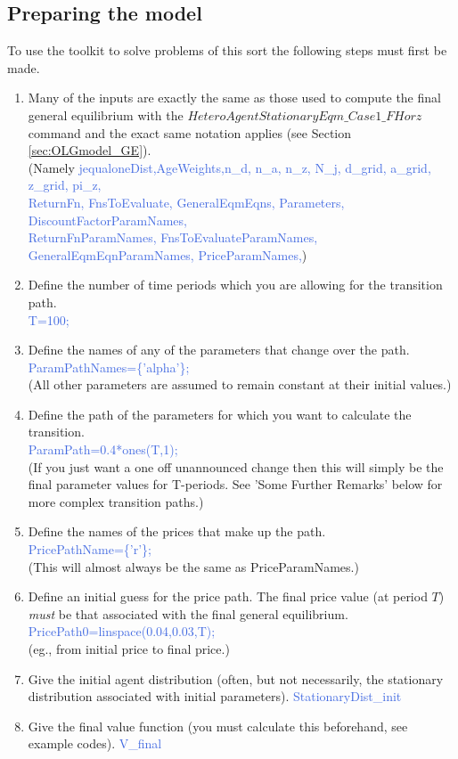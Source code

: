 \subsection{Preparing the model}
To use the toolkit to solve problems of this sort the following steps must first be made.
\begin{enumerate}
 \item Many of the inputs are exactly the same as those used to compute the final general equilibrium with the $HeteroAgentStationaryEqm\_{}Case1\_{}FHorz$ command
   and the exact same notation applies (see Section \ref{sec:OLGmodel_GE}). \\
    (Namely \textcolor{RoyalBlue}{jequaloneDist,AgeWeights,n\_{}d, n\_{}a, n\_{}z, N\_{}j, d\_{}grid, a\_{}grid, z\_{}grid, pi\_{}z,} \\
    \indent \textcolor{RoyalBlue}{ReturnFn, FnsToEvaluate, GeneralEqmEqns, Parameters, DiscountFactorParamNames,} \\
    \indent \textcolor{RoyalBlue}{ReturnFnParamNames, FnsToEvaluateParamNames, GeneralEqmEqnParamNames, PriceParamNames,})
 \item Define the number of time periods which you are allowing for the transition path. \\
    \textcolor{RoyalBlue}{T=100;}
 \item Define the names of any of the parameters that change over the path. \\
   \textcolor{RoyalBlue}{ParamPathNames=\{'alpha'\};} \\
   (All other parameters are assumed to remain constant at their initial values.)
 \item Define the path of the parameters for which you want to calculate the transition. \\
    \textcolor{RoyalBlue}{ParamPath=0.4*ones(T,1);} \\
    (If you just want a one off unannounced change then this will simply be the final parameter values for T-periods. See 'Some Further Remarks' below for more complex transition paths.)
  \item Define the names of the prices that make up the path. \\
   \textcolor{RoyalBlue}{PricePathName=\{'r'\};} \\
   (This will almost always be the same as PriceParamNames.)
  \item Define an initial guess for the price path. The final price value (at period $T$) \textit{must} be that associated with the final general equilibrium.  \\
   \textcolor{RoyalBlue}{PricePath0=linspace(0.04,0.03,T);} \\
   (eg., from initial price to final price.)
  \item Give the initial agent distribution (often, but not necessarily, the stationary distribution associated with initial parameters).
    \textcolor{RoyalBlue}{StationaryDist\_{}init}
  \item Give the final value function (you must calculate this beforehand, see example codes).
    \textcolor{RoyalBlue}{V\_{}final}
\end{enumerate}
